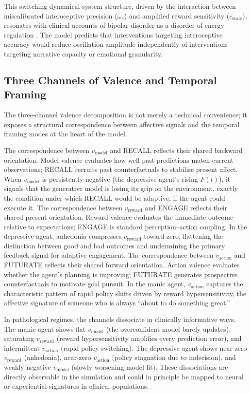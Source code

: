 \documentclass[11pt,a4paper]{article}
\begin{document}
This switching dynamical system structure, driven by the interaction between miscalibrated interoceptive precision ($\omega_e$) and amplified reward sensitivity ($c_{\text{scale}}$), resonates with clinical accounts of bipolar disorder as a disorder of energy regulation \citep{berk2007stages}. The model predicts that interventions targeting interoceptive accuracy would reduce oscillation amplitude independently of interventions targeting narrative capacity or emotional granularity.

\subsection{Three Channels of Valence and Temporal Framing}

The three-channel valence decomposition is not merely a technical convenience; it exposes a structural correspondence between affective signals and the temporal framing modes at the heart of the model.

The correspondence between $v_{\text{model}}$ and RECALL reflects their shared backward orientation. Model valence evaluates how well past predictions match current observations; RECALL recruits past counterfactuals to stabilise present affect. When $v_{\text{model}}$ is persistently negative (the depressive agent's rising $F(t)$), it signals that the generative model is losing its grip on the environment, exactly the condition under which RECALL would be adaptive, if the agent could execute it. The correspondence between $v_{\text{reward}}$ and ENGAGE reflects their shared present orientation. Reward valence evaluates the immediate outcome relative to expectations; ENGAGE is standard perception--action coupling. In the depressive agent, anhedonia compresses $v_{\text{reward}}$ toward zero, flattening the distinction between good and bad outcomes and undermining the primary feedback signal for adaptive engagement. The correspondence between $v_{\text{action}}$ and FUTURATE reflects their shared forward orientation. Action valence evaluates whether the agent's planning is improving; FUTURATE generates prospective counterfactuals to motivate goal pursuit. In the manic agent, $v_{\text{action}}$ captures the characteristic pattern of rapid policy shifts driven by reward hypersensitivity, the affective signature of someone who is always ``about to do something great.''

In pathological regimes, the channels dissociate in clinically informative ways. The manic agent shows flat $v_{\text{model}}$ (the overconfident model barely updates), saturating $v_{\text{reward}}$ (reward hypersensitivity amplifies every prediction error), and intermittent $v_{\text{action}}$ (rapid policy switching). The depressive agent shows near-zero $v_{\text{reward}}$ (anhedonia), near-zero $v_{\text{action}}$ (policy stagnation due to indecision), and weakly negative $v_{\text{model}}$ (slowly worsening model fit). These dissociations are directly observable in the simulation and could in principle be mapped to neural or experiential signatures in clinical populations.
\end{document}
